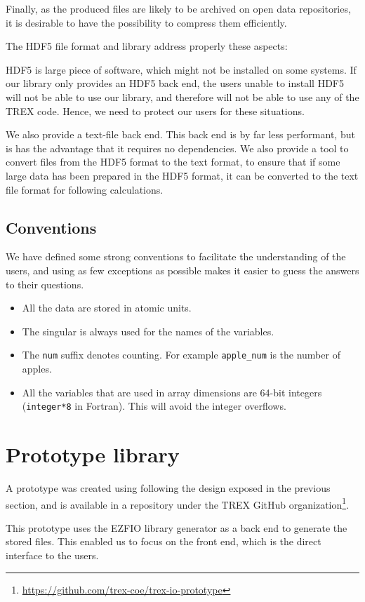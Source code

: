 Finally, as the produced files are likely to be archived on open data
repositories, it is desirable to have the possibility to compress them
efficiently.

The \ac{HDF5} file format and library\cite{hdf5} address properly these aspects:


HDF5 is large piece of software, which might not be installed on some
systems. If our library only provides an HDF5 back end, the users
unable to install HDF5 will not be able to use our library, and
therefore will not be able to use any of the \ac{TREX} code. Hence, we need
to protect our users for these situations.

We also provide a text-file back end. This back end is by far less
performant, but is has the advantage that it requires no dependencies.
We also provide a tool to convert files from the HDF5 format to the
text format, to ensure that if some large data has been prepared in
the HDF5 format, it can be converted to the text file format for
following calculations.




\subsection{Conventions}

We have defined some strong conventions to facilitate the
understanding of the users, and using as few exceptions as possible
makes it easier to guess the answers to their questions.
\begin{itemize}
  \item All the data are stored in atomic units.
  \item The singular is always used for the names of the variables.
  \item The \texttt{num} suffix denotes counting. For example
    \texttt{apple\_num} is the number of apples.
  \item All the variables that are used in array dimensions are 64-bit
    integers (\texttt{integer*8} in Fortran). This will avoid the
    integer overflows.
\end{itemize}

\section{Prototype library}

A prototype was created using following the design exposed in the
previous section, and is available in a repository under the \ac{TREX}
GitHub organization\footnote{\url{https://github.com/trex-coe/trex-io-prototype}}.

This prototype uses the \ac{EZFIO} library generator as a back end to
generate the stored files. This enabled us to focus on the front end,
which is the direct interface to the users.

